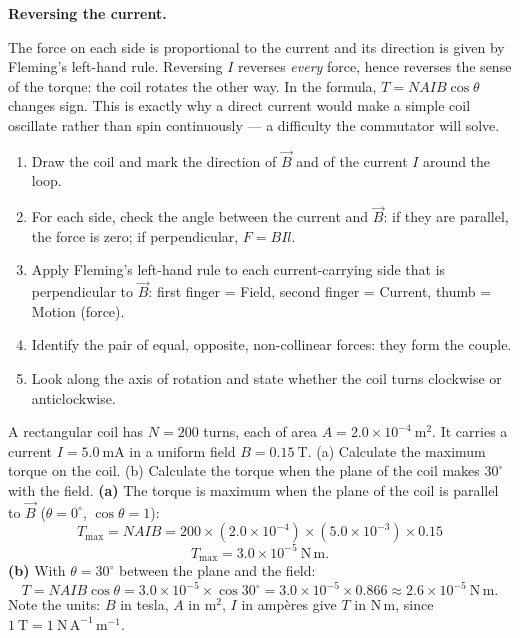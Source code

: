 \documentclass[11pt]{article}
\begin{document}
\textbf{Reversing the current.}\par
The force on each side is proportional to the current and its direction is given by Fleming's left-hand rule. Reversing $I$ reverses \emph{every} force, hence reverses the sense of the torque: the coil rotates the other way. In the formula, $T = NAIB\cos\theta$ changes sign. This is exactly why a direct current would make a simple coil oscillate rather than spin continuously --- a difficulty the commutator will solve.

\begin{methode}
\begin{enumerate}
\item Draw the coil and mark the direction of $\vec{B}$ and of the current $I$ around the loop.
\item For each side, check the angle between the current and $\vec{B}$: if they are parallel, the force is zero; if perpendicular, $F = BIl$.
\item Apply Fleming's left-hand rule to each current-carrying side that is perpendicular to $\vec{B}$: first finger = Field, second finger = Current, thumb = Motion (force).
\item Identify the pair of equal, opposite, non-collinear forces: they form the couple.
\item Look along the axis of rotation and state whether the coil turns clockwise or anticlockwise.
\end{enumerate}
\end{methode}

\begin{exoresolu}
A rectangular coil has $N = 200$ turns, each of area $A = 2.0 \times 10^{-4}\ \mathrm{m^2}$. It carries a current $I = 5.0\ \mathrm{mA}$ in a uniform field $B = 0.15\ \mathrm{T}$. (a) Calculate the maximum torque on the coil. (b) Calculate the torque when the plane of the coil makes $30^{\circ}$ with the field.
\tcblower
\textbf{(a)} The torque is maximum when the plane of the coil is parallel to $\vec{B}$ ($\theta = 0^{\circ}$, $\cos\theta = 1$):
\[ T_{\max} = NAIB = 200 \times (2.0\times10^{-4}) \times (5.0\times10^{-3}) \times 0.15 \]
\[ T_{\max} = 3.0\times10^{-5}\ \mathrm{N\,m}. \]
\textbf{(b)} With $\theta = 30^{\circ}$ between the plane and the field:
\[ T = NAIB\cos\theta = 3.0\times10^{-5}\times\cos 30^{\circ} = 3.0\times10^{-5}\times 0.866 \approx 2.6\times10^{-5}\ \mathrm{N\,m}. \]
Note the units: $B$ in tesla, $A$ in $\mathrm{m^2}$, $I$ in amp\`eres give $T$ in $\mathrm{N\,m}$, since $1\ \mathrm{T} = 1\ \mathrm{N\,A^{-1}\,m^{-1}}$.
\end{exoresolu}
\end{document}

